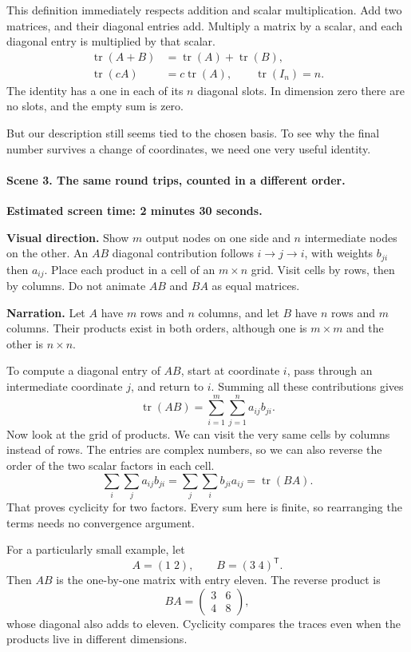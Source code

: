 This definition immediately respects addition and scalar multiplication. Add two matrices, and their diagonal entries add. Multiply a matrix by a scalar, and each diagonal entry is multiplied by that scalar.
\[
\begin{aligned}
\operatorname{tr}(A+B)&=\operatorname{tr}(A)+\operatorname{tr}(B),\\
\operatorname{tr}(cA)&=c\operatorname{tr}(A),\qquad
\operatorname{tr}(I_n)=n.
\end{aligned}
\]
The identity has a one in each of its $n$ diagonal slots. In dimension zero there are no slots, and the empty sum is zero.

But our description still seems tied to the chosen basis. To see why the final number survives a change of coordinates, we need one very useful identity.

\paragraph{Scene 3. The same round trips, counted in a different order.}
\textbf{Estimated screen time: 2 minutes 30 seconds.}

\textbf{Visual direction.} Show $m$ output nodes on one side and $n$ intermediate nodes on the other. An $AB$ diagonal contribution follows $i\mathrel{\to}j\mathrel{\to}i$, with weights $b_{ji}$ then $a_{ij}$. Place each product in a cell of an $m\times n$ grid. Visit cells by rows, then by columns. Do not animate $AB$ and $BA$ as equal matrices.

\textbf{Narration.} Let $A$ have $m$ rows and $n$ columns, and let $B$ have $n$ rows and $m$ columns. Their products exist in both orders, although one is $m\times m$ and the other is $n\times n$.

To compute a diagonal entry of $AB$, start at coordinate $i$, pass through an intermediate coordinate $j$, and return to $i$. Summing all these contributions gives
\[
\operatorname{tr}(AB)=\sum_{i=1}^m\sum_{j=1}^n a_{ij}b_{ji}.
\]
Now look at the grid of products. We can visit the very same cells by columns instead of rows. The entries are complex numbers, so we can also reverse the order of the two scalar factors in each cell.
\[
\sum_i\sum_j a_{ij}b_{ji}
=\sum_j\sum_i b_{ji}a_{ij}
=\operatorname{tr}(BA).
\]
That proves cyclicity for two factors. Every sum here is finite, so rearranging the terms needs no convergence argument.

For a particularly small example, let
\[
A=(1\;2),\qquad B=(3\;4)^{\mathsf{T}}.
\]
Then $AB$ is the one-by-one matrix with entry eleven. The reverse product is
\[
BA=\begin{pmatrix}3&6\\4&8\end{pmatrix},
\]
whose diagonal also adds to eleven. Cyclicity compares the traces even when the products live in different dimensions.


